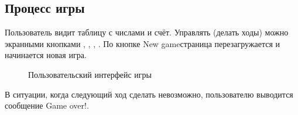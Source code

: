 \documentclass[a4paper,12pt]{article}
\newcommand{\lk}{\guillemotleft}
\newcommand{\rk}{\guillemotright}
\begin{document}
\subsection{Процесс игры}
Пользователь видит таблицу с числами и счёт. Управлять (делать ходы) можно экранными кнопками \rk, \rk, \rk, \rk. По кнопке \lk New game\rk страница перезагружается и начинается новая игра.
\begin{figure}[H]
\caption{Пользовательский интерфейс игры}
\label{move}
\end{figure}
В ситуации, когда следующий ход сделать невозможно, пользователю выводится сообщение \lk Game over!\rk.
\end{document}
